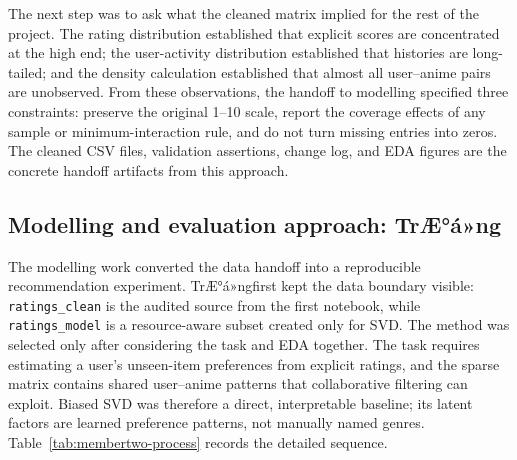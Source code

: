 \documentclass[12pt,a4paper]{article}
\newcommand{\membertwo}{TrÆ°Æ¡ng Nháº­t TrÆ°á»ng -- 29211164915}
\renewcommand{\membertwo}{TrÆ°á»ng}
\begin{document}
The next step was to ask what the cleaned matrix implied for the rest of the project. The rating distribution established that explicit scores are concentrated at the high end; the user-activity distribution established that histories are long-tailed; and the density calculation established that almost all user--anime pairs are unobserved. From these observations, the handoff to modelling specified three constraints: preserve the original 1--10 scale, report the coverage effects of any sample or minimum-interaction rule, and do not turn missing entries into zeros. The cleaned CSV files, validation assertions, change log, and EDA figures are the concrete handoff artifacts from this approach.

\subsection{Modelling and evaluation approach: \membertwo}
The modelling work converted the data handoff into a reproducible recommendation experiment. \membertwo first kept the data boundary visible: \texttt{ratings\_clean} is the audited source from the first notebook, while \texttt{ratings\_model} is a resource-aware subset created only for SVD. The method was selected only after considering the task and EDA together. The task requires estimating a user's unseen-item preferences from explicit ratings, and the sparse matrix contains shared user--anime patterns that collaborative filtering can exploit. Biased SVD was therefore a direct, interpretable baseline; its latent factors are learned preference patterns, not manually named genres. Table~\ref{tab:membertwo-process} records the detailed sequence.
\end{document}
